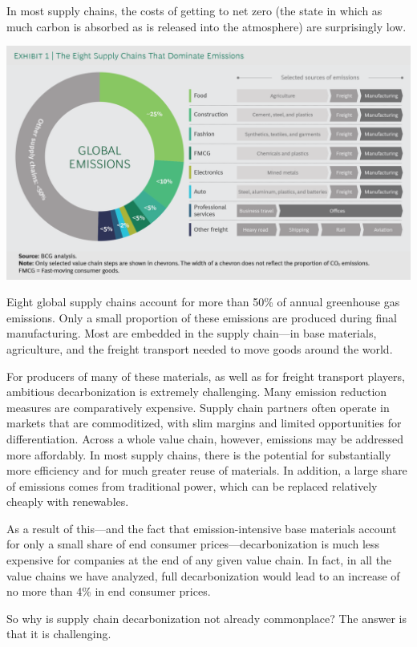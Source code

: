 \documentclass[
]{book}
\begin{document}
In most supply chains, the costs of getting to net zero (the state in which as much carbon is absorbed as is released into the atmosphere) are surprisingly low.

\includegraphics{fig/bcg_8supply_chains.png}

Eight global supply chains account for more than 50\% of annual greenhouse gas emissions. Only a small proportion of these emissions are produced during final manufacturing. Most are embedded in the supply chain---in base materials, agriculture, and the freight transport needed to move goods around the world.

For producers of many of these materials, as well as for freight transport players, ambitious decarbonization is extremely challenging. Many emission reduction measures are comparatively expensive. Supply chain partners often operate in markets that are commoditized, with slim margins and limited opportunities for differentiation. Across a whole value chain, however, emissions may be addressed more affordably. In most supply chains, there is the potential for substantially more efficiency and for much greater reuse of materials.
In addition, a large share of emissions comes from traditional power, which can be replaced relatively cheaply with renewables.

As a result of this---and the fact that emission-intensive base materials account for only a small share of end consumer prices---decarbonization is much less expensive for companies at the end of any given value chain. In fact, in all the value chains we have analyzed, full decarbonization would lead to an increase of no more than 4\% in end consumer prices.

So why is supply chain decarbonization not already commonplace? The answer is that it is challenging.
\end{document}
